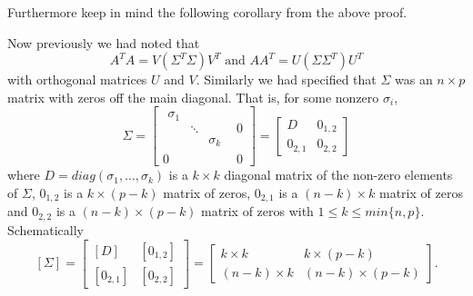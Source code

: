 \documentclass{book}
\begin{document}
Furthermore keep in mind the following corollary from the above proof. 


Now previously we had noted that 
$$
A^TA=V(\Sigma^T\Sigma)V^T
\text { and }
AA^T=U(\Sigma \Sigma^T)U^T
$$
with orthogonal matrices $U$ and $V$. Similarly we had specified that $\Sigma$ was an $n \times p$ matrix with zeros off the main diagonal. That is, for some nonzero $\sigma_i$, 
$$
\Sigma =
\left[
\begin{array}{c|c}
  \begin{matrix}
\sigma_1& & \\
& \ddots& \\
& & \sigma_k
\end{matrix}& 0\\ \hline
  0& 0
\end{array}
\right]
= 
\left[
\begin{array}{c|c}
  D& 0_{1,2}\\ \hline
  0_{2,1}& 0_{2,2}
\end{array}
\right]
$$
where $D=diag(\sigma_1,\ldots,\sigma_k)$ is a $k \times k$ diagonal matrix of the non-zero elements of $\Sigma$, $0_{1,2}$ is a $k \times (p-k)$ matrix of zeros, $0_{2,1}$ is a $(n-k) \times k$ matrix of zeros and $0_{2,2}$ is a $(n-k) \times (p-k)$ matrix of zeros with $1\leq k \leq min\{n,p\}$. Schematically 
$$
[\Sigma] = 
\left[
\begin{array}{c|c}
[D]& [0_{1,2}]\\ \hline
[0_{2,1}]& [0_{2,2}]
\end{array}
\right]
=
\left[
\begin{array}{c|c}
  k \times k& k \times (p-k)\\ \hline
  (n-k) \times k& (n-k) \times (p-k)
\end{array}
\right].
$$
\end{document}
